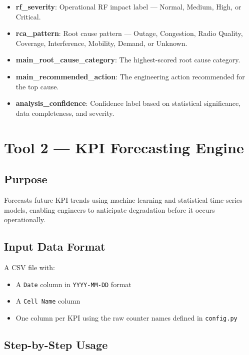 \begin{itemize}
    \item \textbf{rf\_severity}: Operational RF impact label — Normal, Medium, High, or Critical.
    \item \textbf{rca\_pattern}: Root cause pattern — Outage, Congestion, Radio Quality, Coverage, Interference, Mobility, Demand, or Unknown.
    \item \textbf{main\_root\_cause\_category}: The highest-scored root cause category.
    \item \textbf{main\_recommended\_action}: The engineering action recommended for the top cause.
    \item \textbf{analysis\_confidence}: Confidence label based on statistical significance, data completeness, and severity.
\end{itemize}

\section{Tool 2 — KPI Forecasting Engine}

\subsection{Purpose}

Forecasts future KPI trends using machine learning and statistical time-series models, enabling engineers to anticipate degradation before it occurs operationally.

\subsection{Input Data Format}

A CSV file with:
\begin{itemize}
    \item A \texttt{Date} column in \texttt{YYYY-MM-DD} format
    \item A \texttt{Cell Name} column
    \item One column per KPI using the raw counter names defined in \texttt{config.py}
\end{itemize}

\subsection{Step-by-Step Usage}

